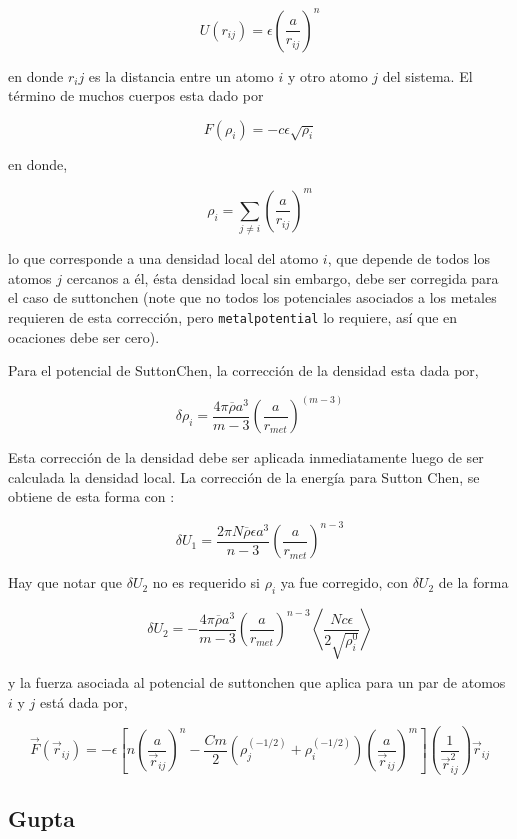 $$U(r_{ij}) = \epsilon\left(\frac{a}{r_{ij}}\right)^n$$

en donde $r_ij$ es la distancia entre un atomo $i$ y otro atomo $j$ del sistema. El t\'ermino de muchos cuerpos esta dado por

$$F(\rho_{i}) = -c\epsilon\sqrt{\rho_i}$$

en donde,

$$\rho_i = \sum_{j\neq i} \left(\frac{a}{r_{ij}}\right)^m$$

lo que corresponde a una densidad local del atomo $i$, que depende de todos los atomos $j$ cercanos a \'el, \'esta densidad local sin embargo, debe ser corregida para el caso de suttonchen (note que no todos los potenciales asociados a los metales requieren de esta correcci\'on, pero \verb|metalpotential| lo requiere, as\'i que en ocaciones debe ser cero).

Para el potencial de SuttonChen, la correcci\'on de la densidad esta dada por,

$$\delta\rho_i=\frac{4\pi\overline{\rho}a^3}{m-3}\left(\frac{a}{r_{met}}\right)^{(m-3)}$$

Esta correcci\'on de la densidad debe ser aplicada inmediatamente luego de ser calculada la densidad local. La correcci\'on de la energ\'ia para Sutton Chen, se obtiene de esta forma con :

$$\delta U_1 = \frac{2\pi N\overline{\rho}\epsilon a^3}{n-3}\left(\frac{a}{r_{met}}\right)^{n-3}$$

Hay que notar que $\delta U_2$ no es requerido si $\rho_i$ ya fue corregido, con $\delta U_2$ de la forma

$$\delta U_2 = -\frac{4\pi\overline{\rho}a^3}{m-3}\left(\frac{a}{r_{met}}\right)^{n-3}\left<\frac{Nc\epsilon}{2\sqrt{\rho_i^0}}\right>$$

y la fuerza asociada al potencial de suttonchen que aplica para un par de atomos $i$ y $j$ est\'a dada por,

$$\vec{F}(\vec{r}_{ij}) = -\epsilon\left[n\left(\frac{a}{\vec{r}_{ij}}\right)^n - \frac{Cm}{2}(\rho_j^{(-1/2)}+\rho_i^{(-1/2)})\left(\frac{a}{\vec{r}_{ij}}\right)^m\right]\left(\frac{1}{\vec{r}_{ij}^2}\right)\vec{r}_{ij}$$



\subsection{Gupta}

